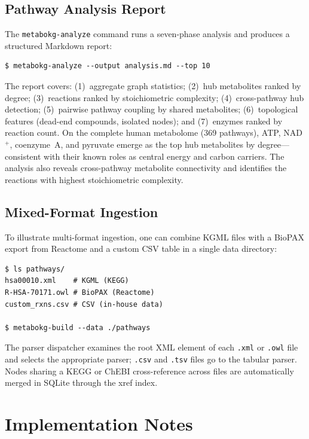\documentclass[10pt]{article}
\begin{document}
\subsection{Pathway Analysis Report}

The \texttt{metabokg-analyze} command runs a seven-phase analysis and produces a
structured Markdown report:

\begin{lstlisting}[style=bash]
$ metabokg-analyze --output analysis.md --top 10
\end{lstlisting}

The report covers: (1)~aggregate graph statistics; (2)~hub metabolites ranked
by degree; (3)~reactions ranked by stoichiometric complexity;
(4)~cross-pathway hub detection; (5)~pairwise pathway coupling by shared
metabolites; (6)~topological features (dead-end compounds, isolated nodes);
and (7)~enzymes ranked by reaction count. On the complete human metabolome
(369 pathways), ATP, NAD$^{+}$, coenzyme~A, and pyruvate emerge as the top
hub metabolites by degree---consistent with their known roles as central
energy and carbon carriers. The analysis also reveals cross-pathway metabolite
connectivity and identifies the reactions with highest stoichiometric
complexity.

\subsection{Mixed-Format Ingestion}

To illustrate multi-format ingestion, one can combine KGML files with a
BioPAX export from Reactome and a custom CSV table in a single data directory:

\begin{lstlisting}[style=bash]
$ ls pathways/
hsa00010.xml    # KGML (KEGG)
R-HSA-70171.owl # BioPAX (Reactome)
custom_rxns.csv # CSV (in-house data)

$ metabokg-build --data ./pathways
\end{lstlisting}

The parser dispatcher examines the root XML element of each \texttt{.xml} or
\texttt{.owl} file and selects the appropriate parser; \texttt{.csv} and
\texttt{.tsv} files go to the tabular parser. Nodes sharing a KEGG or ChEBI
cross-reference across files are automatically merged in SQLite through the
xref index.

\section{Implementation Notes}
\label{sec:impl}
\end{document}
